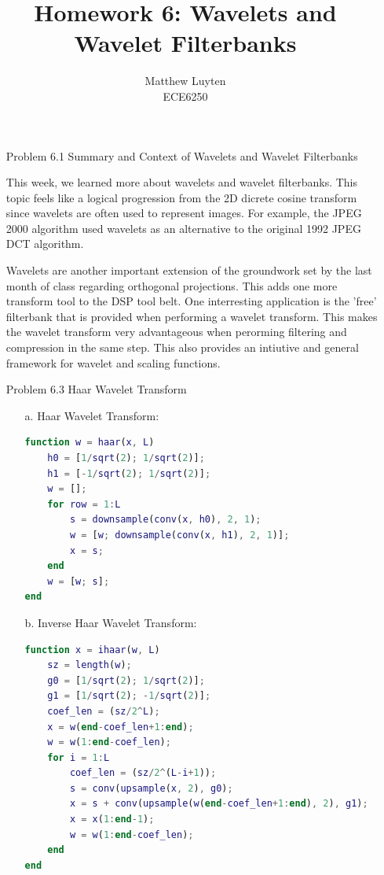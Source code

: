 \documentclass[12pt]{article}
\begin{document}
 
\title{Homework 6: Wavelets and Wavelet Filterbanks}
\author{Matthew Luyten\\
ECE6250}

\maketitle

\begin{enumerate}
\item[Problem 6.1] Summary and Context of Wavelets and Wavelet Filterbanks

This week, we learned more about wavelets and wavelet filterbanks. This topic
feels like a logical progression from the 2D dicrete cosine transform since 
wavelets are often used to represent images. For example, the JPEG 2000 algorithm
used wavelets as an alternative to the original 1992 JPEG DCT algorithm.

Wavelets are another important extension of the groundwork set by the last month of
class regarding orthogonal projections. This adds one more transform tool to the DSP 
tool belt. One interresting application is the 'free' filterbank that is provided
when performing a wavelet transform. This makes the wavelet transform very
advantageous when perorming filtering and compression in the same step. This also
provides an intiutive and general framework for wavelet and scaling functions.

\newpage

\item[Problem 6.3] Haar Wavelet Transform

\begin{enumerate}

\item[a.] Haar Wavelet Transform:
\begin{lstlisting}[language=matlab]
function w = haar(x, L)
    h0 = [1/sqrt(2); 1/sqrt(2)];
    h1 = [-1/sqrt(2); 1/sqrt(2)];
    w = [];
    for row = 1:L
        s = downsample(conv(x, h0), 2, 1);
        w = [w; downsample(conv(x, h1), 2, 1)];
        x = s;
    end
    w = [w; s];
end
\end{lstlisting}

\item[b.] Inverse Haar Wavelet Transform:
\begin{lstlisting}[language=matlab]
function x = ihaar(w, L)
    sz = length(w);
    g0 = [1/sqrt(2); 1/sqrt(2)];
    g1 = [1/sqrt(2); -1/sqrt(2)];
    coef_len = (sz/2^L);
    x = w(end-coef_len+1:end);
    w = w(1:end-coef_len);
    for i = 1:L
        coef_len = (sz/2^(L-i+1));
        s = conv(upsample(x, 2), g0);
        x = s + conv(upsample(w(end-coef_len+1:end), 2), g1);
        x = x(1:end-1);
        w = w(1:end-coef_len);
    end
end
\end{lstlisting}


\end{enumerate}
\end{enumerate}
\end{document}
